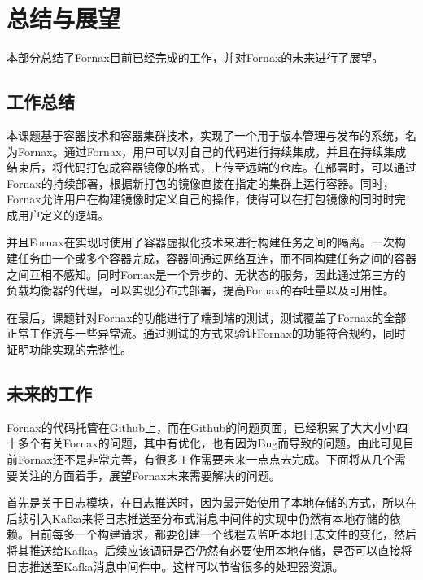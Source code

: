
\chapter{总结与展望}

本部分总结了Fornax目前已经完成的工作，并对Fornax的未来进行了展望。

\section{工作总结}

本课题基于容器技术和容器集群技术，实现了一个用于版本管理与发布的系统，名为Fornax。通过Fornax，用户可以对自己的代码进行持续集成，并且在持续集成结束后，将代码打包成容器镜像的格式，上传至远端的仓库。在部署时，可以通过Fornax的持续部署，根据新打包的镜像直接在指定的集群上运行容器。同时，Fornax允许用户在构建镜像时定义自己的操作，使得可以在打包镜像的同时时完成用户定义的逻辑。

并且Fornax在实现时使用了容器虚拟化技术来进行构建任务之间的隔离。一次构建任务由一个或多个容器完成，容器间通过网络互连，而不同构建任务之间的容器之间互相不感知。同时Fornax是一个异步的、无状态的服务，因此通过第三方的负载均衡器的代理，可以实现分布式部署，提高Fornax的吞吐量以及可用性。

在最后，课题针对Fornax的功能进行了端到端的测试，测试覆盖了Fornax的全部正常工作流与一些异常流。通过测试的方式来验证Fornax的功能符合规约，同时证明功能实现的完整性。

\section{未来的工作}

Fornax的代码托管在Github上，而在Github的问题页面，已经积累了大大小小四十多个有关Fornax的问题，其中有优化，也有因为Bug而导致的问题。由此可见目前Fornax还不是非常完善，有很多工作需要未来一点点去完成。下面将从几个需要关注的方面着手，展望Fornax未来需要解决的问题。

首先是关于日志模块，在日志推送时，因为最开始使用了本地存储的方式，所以在后续引入Kafka来将日志推送至分布式消息中间件的实现中仍然有本地存储的依赖。目前每多一个构建请求，都要创建一个线程去监听本地日志文件的变化，然后将其推送给Kafka。后续应该调研是否仍然有必要使用本地存储，是否可以直接将日志推送至Kafka消息中间件中。这样可以节省很多的处理器资源。

